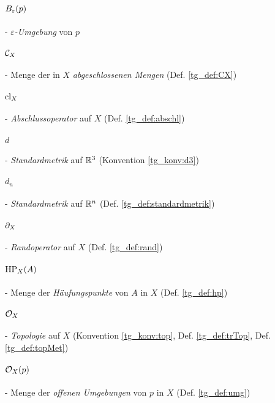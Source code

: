    
    \paragraph{$B_\varepsilon(p)$} - \quad \textit{$\varepsilon$-Umgebung} von $p$

    \paragraph{$\mathcal{C}_X$} - \quad Menge der in $X$ \textit{abgeschlossenen Mengen} (Def. \ref{tg_def:CX})

    \paragraph{$\text{cl}_X$} - \quad \textit{Abschlussoperator} auf $X$ (Def. \ref{tg_def:abschl})

    \paragraph{$d$} - \quad \textit{Standardmetrik} auf $\mathbb{R}^3$ (Konvention \ref{tg_konv:d3})
    
    \paragraph{$d_n$} - \quad \textit{Standardmetrik} auf $\mathbb{R}^n$ (Def. \ref{tg_def:standardmetrik})
    
    \paragraph{$\partial_X$} - \quad \textit{Randoperator} auf $X$ (Def. \ref{tg_def:rand})

    \paragraph{$\text{HP}_X(A)$} - \quad Menge der \textit{Häufungspunkte} von $A$ in $X$ (Def. \ref{tg_def:hp})
 
    \paragraph{$\mathcal{O}_X$} - \quad \textit{Topologie} auf $X$ (Konvention \ref{tg_konv:top}, Def. \ref{tg_def:trTop}, Def. \ref{tg_def:topMet})

    \paragraph{$\mathcal{O}_X(p)$} - \quad Menge der \textit{offenen Umgebungen} von $p$ in $X$ (Def. \ref{tg_def:umg})

